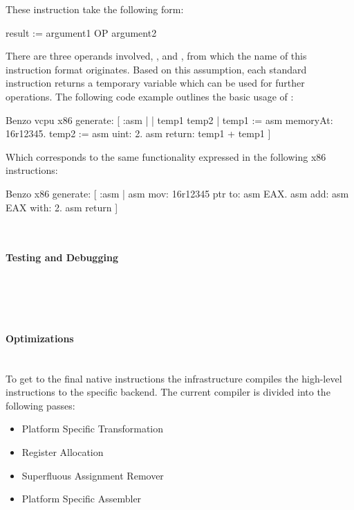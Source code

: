 These \TAC instruction take the following form:
%
\begin{stcode}{}
result := argument1 OP argument2
\end{stcode}
%
There are three operands involved, ,  and , from which the name of this instruction format originates.
Based on this assumption, each standard \VCPU instruction returns a temporary variable which can be used for further operations.
The following code example outlines the basic usage of \VCPU:
%
\begin{stcode}[
	label={lst:benzo-problem-vcpu}, 
	caption={Basic \VCPU Example}
]{}
Benzo vcpu x86 generate: [ :asm | | temp1 temp2 |
	temp1 := asm memoryAt: 16r12345.
	temp2 := asm uint: 2.
	asm return: temp1 + temp1 ]
\end{stcode}
%
Which corresponds to the same functionality expressed in the following x86 instructions:
%
\begin{stcode}{}
Benzo x86 generate: [ :asm |
	asm mov: 16r12345 ptr to: asm EAX.
	asm add: asm EAX with: 2.
	asm return ]
\end{stcode}

 \\

\paragraph{\VCPU Testing and Debugging}
 \\
 \\
 \\


\paragraph{\VCPU Optimizations}
 \\

To get to the final native instructions the \VCPU infrastructure compiles the high-level instructions to the specific backend.
The current compiler is divided into the following passes:
%
\begin{itemize}[noitemsep]
\item Platform Specific Transformation
\item Register Allocation
\item Superfluous Assignment Remover
\item Platform Specific Assembler
\end{itemize}



